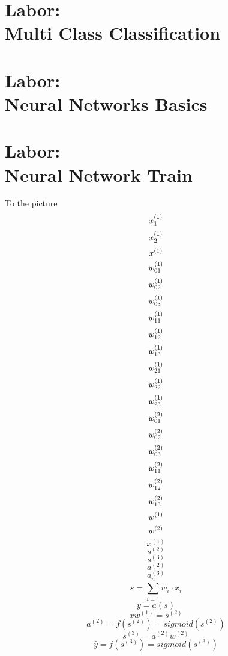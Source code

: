 \documentclass[12pt]{article}
\begin{document}
\section{Labor:\\ \large Multi Class Classification}
\newpage
\section{Labor:\\ \large Neural Networks Basics}
\newpage
\section{Labor:\\ \large Neural Network Train}
To the picture
$$x^{(1)}_1\\$$
$$x^{(1)}_2\\$$
$$x^{(1)}\\$$
$$w_{01}^{(1)}\\$$
$$w_{02}^{(1)}\\$$
$$w_{03}^{(1)}\\$$
$$w_{11}^{(1)}\\$$
$$w_{12}^{(1)}\\$$
$$w_{13}^{(1)}\\$$
$$w_{21}^{(1)}\\$$
$$w_{22}^{(1)}\\$$
$$w_{23}^{(1)}\\$$
$$w_{01}^{(2)}\\$$
$$w_{02}^{(2)}\\$$
$$w_{03}^{(2)}\\$$
$$w_{11}^{(2)}\\$$
$$w_{12}^{(2)}\\$$
$$w_{13}^{(2)}\\$$
$$w^{(1)}\\$$
$$w^{(2)}\\$$
$$x^{(1)}$$
$$s^{(2)}$$
$$s^{(3)}$$
$$a^{(2)}$$
$$a^{(3)}$$
\begin{equation}
s = \sum_{i=1}^{n}w_i\cdot x_i
\end{equation}
\begin{equation}
y = a(s)
\end{equation}
\newpage
\begin{equation}
xw^{(1)} = s^{(2)}
\end{equation}
\begin{equation}
a^{(2)} = f(s^{(2)}) = sigmoid(s^{(2)}) 
\end{equation}
\begin{equation}
s^{(3)} = a^{(2)}w^{(2)}
\end{equation}
\begin{equation}
\hat{y} = f(s^{(3)}) = sigmoid(s^{(3)})
\end{equation}
\end{document}
